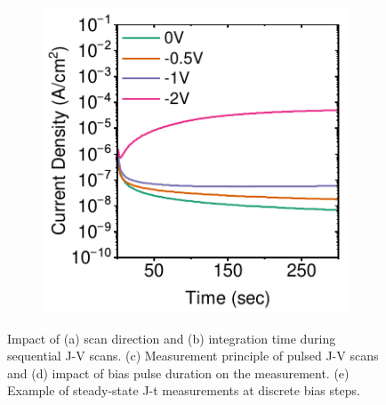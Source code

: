 \begin{figure}[ht!]
    \begin{subfigure}[b]{0.35\textwidth}
        \centering
        \includegraphics[width=\textwidth]{chapters/material_properties/images/Steady-State-plot.pdf}
        \caption{}
        \label{fig:ch2:steady_state}
    \end{subfigure}

    \caption[Impact of measurement settings on the electrical characterization of PePDs.]{Impact of (a) scan direction and (b) integration time during sequential J-V scans. (c) Measurement principle of pulsed J-V scans and (d) impact of bias pulse duration on the measurement. (e) Example of steady-state J-t measurements at discrete bias steps.}
    \label{fig:ch2:types_of_measurement}
\end{figure}


